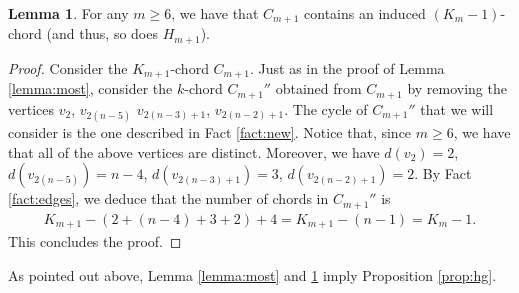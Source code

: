 \documentclass[12pt]{article}
\theoremstyle{definition}
\newtheorem{lemma}[thm]{Lemma}
\begin{document}
    \begin{lemma} \label{lemma:remainder}
        For any $m \geq 6$, we have that $C_{m+1}$ contains
        an induced $\left(K_{m} - 1\right)$-chord
        (and thus, so does $H_{m+1}$).
    \end{lemma}
    \begin{proof}
        Consider the $K_{m+1}$-chord $C_{m+1}$.
        Just as in the proof of Lemma \ref{lemma:most},
        consider the $k$-chord $C_{m+1}''$ obtained
        from $C_{m+1}$ by removing the vertices
        $v_2$, $v_{2\left(n-5\right)}$
        $v_{2\left(n-3\right)+1}$, $v_{2\left(n-2\right)+1}$.
        The cycle of $C_{m+1}''$ that
        we will consider is the one
        described in Fact \ref{fact:new}.
        Notice that, since $m \geq 6$, we have
        that all of the above vertices
        are distinct. Moreover, we have
        $d\left(v_2\right) = 2$, 
        $d\left(v_{2\left(n-5\right)}\right) = n-4$,
        $d\left(v_{2\left(n-3\right)+1}\right)=3$,
        $d\left(v_{2\left(n-2\right)+1}\right) = 2$.
        By Fact \ref{fact:edges}, 
        we deduce that the number of chords
        in $C_{m+1}''$ is
        \begin{gather*}
            K_{m+1} - \left(2 + \left(n-4\right)
            + 3 + 2\right) + 4 =
            K_{m+1} - \left(n-1\right) = K_{m} -1.
        \end{gather*}
        This concludes the proof.
    \end{proof}

    As pointed out above, Lemma
    \ref{lemma:most} and \ref{lemma:remainder}
    imply Proposition \ref{prop:hg}.
\end{document}
